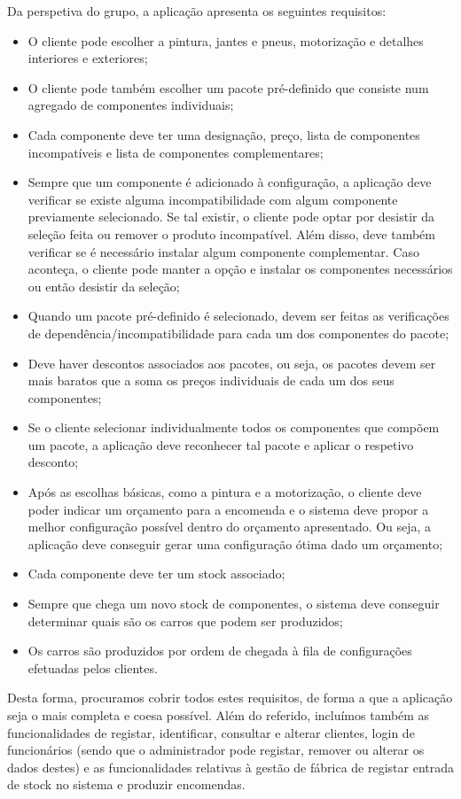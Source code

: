 Da perspetiva do grupo, a aplicação apresenta os seguintes requisitos:
\begin{itemize}
	\item O cliente pode escolher a pintura, jantes e pneus, motorização e detalhes interiores e exteriores;
	\item O cliente pode também escolher um pacote pré-definido que consiste num agregado de componentes individuais;
	\item Cada componente deve ter uma designação, preço, lista de componentes incompatíveis e lista de componentes complementares;
	\item Sempre que um componente é adicionado à configuração, a aplicação deve verificar se existe alguma incompatibilidade com algum componente previamente selecionado. Se tal existir, o cliente pode optar por desistir da seleção feita ou remover o produto incompatível. Além disso, deve também verificar se é necessário instalar algum componente complementar. Caso aconteça, o cliente pode manter a opção e instalar os componentes necessários ou então desistir da seleção;
	\item Quando um pacote pré-definido é selecionado, devem ser feitas as verificações de dependência/incompatibilidade para cada um dos componentes do pacote;
	\item Deve haver descontos associados aos pacotes, ou seja, os pacotes devem ser mais baratos que a soma os preços individuais de cada um dos seus componentes;
	\item Se o cliente selecionar individualmente todos os componentes que compõem um pacote, a aplicação deve reconhecer tal pacote e aplicar o respetivo desconto;
	\item Após as escolhas básicas, como a pintura e a motorização, o cliente deve poder indicar um orçamento para a encomenda e o sistema deve propor a melhor configuração possível dentro do orçamento apresentado. Ou seja, a aplicação deve conseguir gerar uma configuração ótima dado um orçamento;
	\item Cada componente deve ter um stock associado;
	\item Sempre que chega um novo stock de componentes, o sistema deve conseguir determinar quais são os carros que podem ser produzidos;
	\item Os carros são produzidos por ordem de chegada à fila de configurações efetuadas pelos clientes.
\end{itemize}
Desta forma, procuramos cobrir todos estes requisitos, de forma a que a aplicação seja o mais completa e coesa possível. Além do referido, incluímos também as funcionalidades de registar, identificar, consultar e alterar clientes, login de funcionários (sendo que o administrador pode registar, remover ou alterar os dados destes) e as funcionalidades relativas à gestão de fábrica de registar entrada de stock no sistema e produzir encomendas.